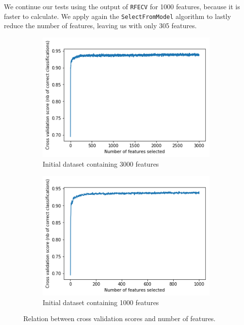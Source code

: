 We continue our tests using the output of \texttt{RFECV} for 1000 features, because it is faster to calculate. 
We apply again the \texttt{SelectFromModel} algorithm to lastly reduce the number of features, leaving us with only 305 features.

\begin{figure}[]
	\centering
	\begin{subfigure}[t]{0.48\textwidth}
		\centering
		\includegraphics[width=\linewidth]{rfecv-from3000.png}
		\caption{Initial dataset containing 3000 features}\label{fig:rfecv3000}		
	\end{subfigure}
	\begin{subfigure}[t]{0.48\textwidth}
		\centering
		\includegraphics[width=\linewidth]{rfecv1000.png}
		\caption{Initial dataset containing 1000 features}\label{fig:rfecv1000}
	\end{subfigure}
	\caption{Relation between cross validation scores and number of features.}\label{fig:rfecv}
\end{figure}

